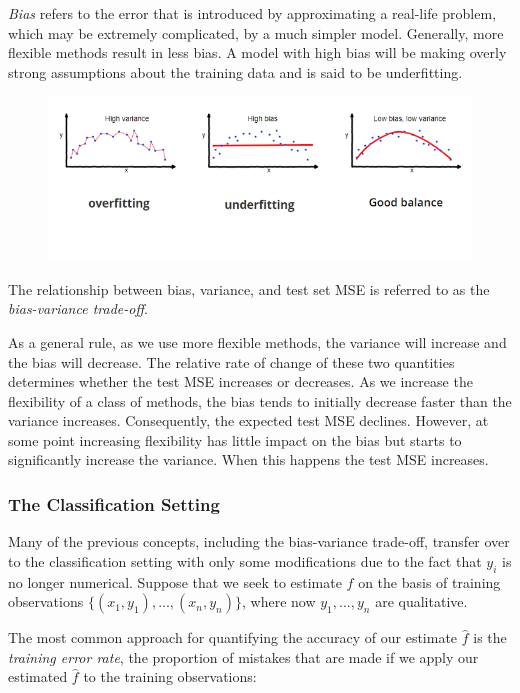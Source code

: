 \documentclass{article}
\numberwithin{equation}{section}
\begin{document}
\textit{Bias} refers to the error that is introduced by approximating a real-life problem, which may be extremely complicated, by a much simpler model. Generally, more flexible methods result in less bias. A model with high bias will be making overly strong assumptions about the training data and is said to be underfitting. 

\begin{figure}[h]
    \centering
    \includegraphics[width=13cm]{bias-variance-tradeoff.png}
\end{figure}
The relationship between bias, variance, and test set MSE is referred to as the \textit{bias-variance trade-off}. 

As a general rule, as we use more flexible methods, the variance will increase and the bias will decrease. The relative rate of change of these two quantities determines whether the test MSE increases or decreases. As we increase the flexibility of a class of methods, the bias tends to initially decrease faster than the variance increases. Consequently, the expected test MSE declines. However, at some point increasing flexibility has little impact on the bias but starts to significantly increase the variance. When this happens the test MSE increases. 


\subsubsection{The Classification Setting}
Many of the previous concepts, including the bias-variance trade-off, transfer over to the classification setting with only some modifications due to the fact that $y_i$ is no longer numerical. Suppose that we seek to estimate $f$ on the basis of training observations $\{(x_1, y_1),...,(x_n, y_n)\}$, where now $y_1,...,y_n$ are qualitative.

The most common approach for quantifying the accuracy of our estimate $\hat f$ is the \textit{training error rate}, the proportion of mistakes that are made if we apply our estimated $\hat f$ to the training observations:
\end{document}
